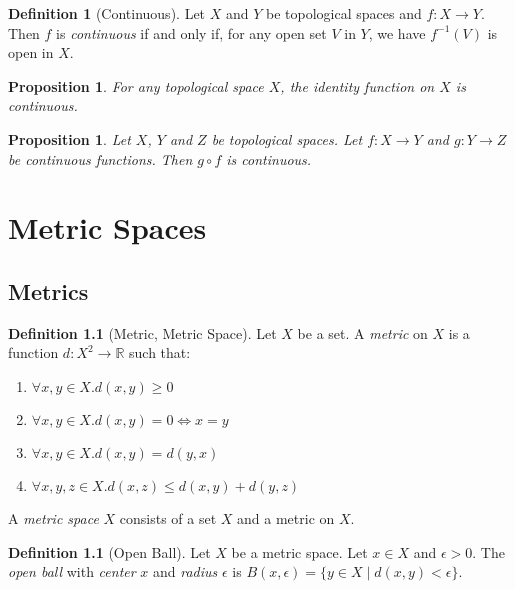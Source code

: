 \documentclass{book}
\newtheorem{proposition}[lemma]{Proposition}
\theoremstyle{definition}
\newtheorem{definition}[lemma]{Definition}
\newcommand{\inv}[1]{\ensuremath{{#1}^{-1}}}
\newcommand{\Real}{\ensuremath{\mathbb{R}}}
\begin{document}
\begin{definition}[Continuous]
    Let $X$ and $Y$ be topological spaces and $f : X \rightarrow Y$. Then $f$ is \emph{continuous} if and only if, for any open set $V$
    in $Y$, we have $\inv{f}(V)$ is open in $X$.
\end{definition}

\begin{proposition}
    For any topological space $X$, the identity function on $X$ is continuous.
\end{proposition}

\begin{proposition}
    Let $X$, $Y$ and $Z$ be topological spaces. Let $f : X \rightarrow Y$ and $g : Y \rightarrow Z$ be continuous functions.
    Then $g \circ f$ is continuous.
\end{proposition}

\chapter{Metric Spaces}

\section{Metrics}

\begin{definition}[Metric, Metric Space]
    Let $X$ be a set. A \emph{metric} on $X$ is a function $d : X^2 \rightarrow \Real$ such that:
    \begin{enumerate}
        \item $\forall x,y \in X. d(x,y) \geq 0$
        \item $\forall x,y \in X. d(x,y) = 0 \Leftrightarrow x = y$
        \item $\forall x,y \in X. d(x,y) = d(y,x)$
        \item $\forall x,y,z \in X. d(x,z) \leq d(x,y) + d(y,z)$
    \end{enumerate}

    A \emph{metric space} $X$ consists of a set $X$ and a metric on $X$.
\end{definition}

\begin{definition}[Open Ball]
    Let $X$ be a metric space. Let $x \in X$ and $\epsilon > 0$. The \emph{open ball} with \emph{center} $x$
    and \emph{radius} $\epsilon$ is $B(x, \epsilon) = \{ y \in X \mid d(x,y) < \epsilon \}$.
\end{definition}
\end{document}
